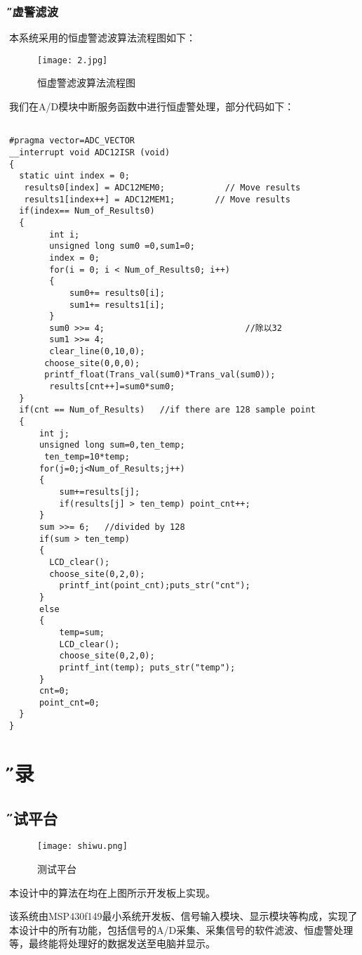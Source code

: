 \documentclass[12pt,a4paper]{article} %
\newcommand{\xiaosanhao}{\fontsize{15pt}{\baselineskip}\selectfont}    %
\newcommand\specialsectioning{\par
  \setcounter{section}{0}%
  \setcounter{subsection}{0}%
  \renewcommand\thesection{\relax}}
\begin{document}
		\subsubsection{\H 恒虚警滤波 }
		
		本系统采用的恒虚警滤波算法流程图如下：
\begin{figure}[H] %
 		  \centering
 		  \texttt{[image: 2.jpg]} 
  		  \caption{恒虚警滤波算法流程图 }
  		 \label{fig:1.1.1}
\end{figure}
 
 我们在A/D模块中断服务函数中进行恒虚警处理，部分代码如下：
\begin{lstlisting}

#pragma vector=ADC_VECTOR
__interrupt void ADC12ISR (void)
{
  static uint index = 0;
   results0[index] = ADC12MEM0;            // Move results
   results1[index++] = ADC12MEM1;        // Move results
  if(index== Num_of_Results0)
  {
        int i;
        unsigned long sum0 =0,sum1=0;
        index = 0;
        for(i = 0; i < Num_of_Results0; i++)
        {
            sum0+= results0[i];
            sum1+= results1[i];
        }
        sum0 >>= 4;                            //除以32
        sum1 >>= 4;
        clear_line(0,10,0);
       choose_site(0,0,0);
       printf_float(Trans_val(sum0)*Trans_val(sum0));
        results[cnt++]=sum0*sum0;
  }
  if(cnt == Num_of_Results)   //if there are 128 sample point
  {
      int j;
      unsigned long sum=0,ten_temp;
       ten_temp=10*temp;
      for(j=0;j<Num_of_Results;j++)
      {
          sum+=results[j];
          if(results[j] > ten_temp) point_cnt++;
      }
      sum >>= 6;   //divided by 128
      if(sum > ten_temp)
      {
        LCD_clear();
        choose_site(0,2,0);
          printf_int(point_cnt);puts_str("cnt");
      }
      else
      {
          temp=sum;
          LCD_clear();
          choose_site(0,2,0);
          printf_int(temp); puts_str("temp");
      }
      cnt=0;
      point_cnt=0;
  }
}

\end{lstlisting}
 \newpage
 \specialsectioning
 \titleformat{\section}{\centering\Huge\bfseries}{\,\thechapter\,}{1em}{}
  \section{\xiaosanhao \H 附录}
  \subsection*{\H 测试平台 }
  \begin{figure}[h] %
 		  \centering
 		  \texttt{[image: shiwu.png]} 
  		  \caption{测试平台}
  		 \label{fig:1.1.1}
		\end{figure}
		\par 本设计中的算法在均在上图所示开发板上实现。
		\par 该系统由MSP430f149最小系统开发板、信号输入模块、显示模块等构成，实现了本设计中的所有功能，包括信号的A/D采集、采集信号的软件滤波、恒虚警处理等，最终能将处理好的数据发送至电脑并显示。
\end{document}
